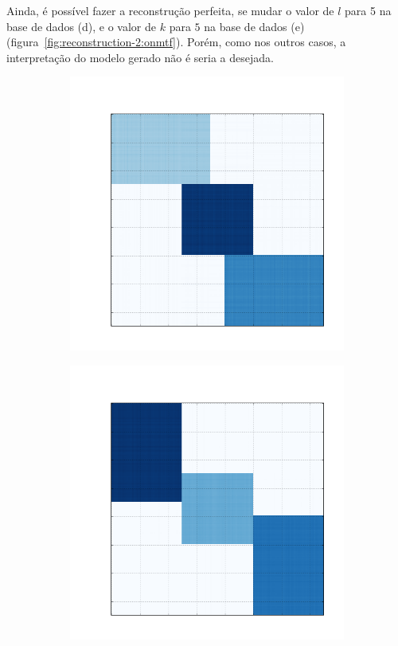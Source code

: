 \documentclass[
    12pt,                %
    oneside,            %
    a4paper,            %
    english,            %
    brazil                %
    ]{abntex2ppgsi}
\begin{document}
Ainda, é possível fazer a reconstrução perfeita, se mudar o valor de $l$ para 5 na base de dados (d), e o valor de $k$ para $5$ na base de dados (e) (figura~\ref{fig:reconstruction-2:onmtf}).
Porém, como nos outros casos, a interpretação do modelo gerado não é seria a desejada.

\begin{figure}[H]
\centering
    \caption{
        Resultado da reconstrução da base de dados (d) com $k = 5$ e (e) com $l = 5$, respectivamente, utilizando o algoritmo \textit{ONMTF}.
    }
    \begin{subfigure}[b]{0.18\textwidth}
        \includegraphics[width=\textwidth]{img/d-reconstruction-2-onmtf.png}
    \end{subfigure}
    \begin{subfigure}[b]{0.18\textwidth}
        \includegraphics[width=\textwidth]{img/e-reconstruction-2-onmtf.png}

\end{subfigure}
\end{figure}
\end{document}
